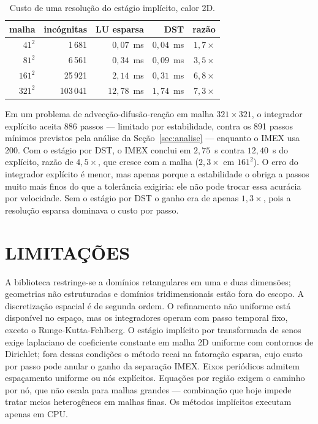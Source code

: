 \documentclass[10pt,brazil,english]{article}
\begin{document}
\begin{table}[!htb]
\centering
\caption{Custo de uma resolução do estágio implícito, calor 2D.}
\label{tab:dst}
\begin{tabular}{rrrrr}
\toprule
malha & incógnitas & LU esparsa & DST & razão \\
\midrule
$41^2$  & 1\,681   & $0{,}07$~ms  & $0{,}04$~ms & $1{,}7\times$ \\
$81^2$  & 6\,561   & $0{,}34$~ms  & $0{,}09$~ms & $3{,}5\times$ \\
$161^2$ & 25\,921  & $2{,}14$~ms  & $0{,}31$~ms & $6{,}8\times$ \\
$321^2$ & 103\,041 & $12{,}78$~ms & $1{,}74$~ms & $7{,}3\times$ \\
\bottomrule
\end{tabular}
\end{table}

Em um problema de advecção-difusão-reação em malha $321\times321$, o integrador
explícito aceita 886 passos --- limitado por estabilidade, contra os 891 passos
mínimos previstos pela análise da Seção~\ref{sec:analise} --- enquanto o IMEX
usa 200. Com o estágio por DST, o IMEX conclui em $2{,}75$~s contra $12{,}40$~s
do explícito, razão de $4{,}5\times$, que cresce com a malha ($2{,}3\times$ em
$161^2$). O erro do integrador explícito é menor, mas apenas porque a
estabilidade o obriga a passos muito mais finos do que a tolerância exigiria:
ele não pode trocar essa acurácia por velocidade. Sem o estágio por DST o ganho
era de apenas $1{,}3\times$, pois a resolução esparsa dominava o custo por passo.

\section{LIMITAÇÕES}

A biblioteca restringe-se a domínios retangulares em uma e duas dimensões; geometrias não estruturadas e domínios tridimensionais estão fora do escopo. A discretização espacial é de segunda ordem. O refinamento não uniforme está disponível no espaço, mas os integradores operam com passo temporal fixo, exceto o Runge-Kutta-Fehlberg. O estágio implícito por transformada de senos exige laplaciano de coeficiente constante em malha 2D uniforme com contornos de Dirichlet; fora dessas condições o método recai na fatoração esparsa, cujo custo por passo pode anular o ganho da separação IMEX. Eixos periódicos admitem espaçamento uniforme ou nós explícitos. Equações por região exigem o caminho por nó, que não escala para malhas grandes --- combinação que hoje impede tratar meios heterogêneos em malhas finas. Os métodos implícitos executam apenas em CPU.
\end{document}
